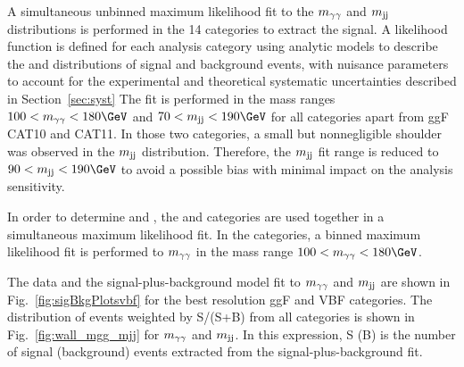 \documentclass[11pt,twoside,a4paper,cmspaper,final,collab]{cms-tdr}
\begin{document}
A simultaneous unbinned
maximum likelihood fit to the $m_{\gamma\gamma}$ and $m_\text{jj}$ distributions is performed in the 14 \HH categories to extract the \HH signal. A likelihood function is defined for each analysis category using analytic models to describe the \Mgg and \Mjj distributions of signal and background events, with nuisance parameters to account for the experimental and theoretical systematic uncertainties described in Section~\ref{sec:syst}
 The fit is performed in the mass ranges \mbox{$100 < \Mgg < 180\GeV$} and \mbox{$70 < \Mjj < 190 \GeV$} for all categories apart from ggF CAT10 and CAT11. In those two categories, a small but nonnegligible shoulder was observed in the $m_\text{jj}$ distribution. Therefore, the $m_\text{jj}$ fit range is reduced to \mbox{$90 < \Mjj < 190 \GeV$} to avoid a possible bias with minimal
impact on the analysis sensitivity. 

In order to determine \kapl and \kapt, the \HH and \ttH categories are used together in a simultaneous maximum likelihood fit. 
In the \ttH categories, a binned maximum likelihood fit is performed to $m_{\gamma\gamma}$ in the mass range $100 < \Mgg < 180\GeV$. 

The data and the signal-plus-background model fit to $m_{\gamma\gamma}$ and $m_\text{jj}$ are shown in Fig.~\ref{fig:sigBkgPlotsvbf} for the best resolution ggF and VBF categories. 
The distribution of events weighted by S/(S+B) from all \HH categories is shown in Fig.~\ref{fig:wall_mgg_mjj} for $m_{\gamma\gamma}$ and $m_\text{jj}$. In this expression, S (B) is the number of signal (background) events extracted from the signal-plus-background fit.
\end{document}
